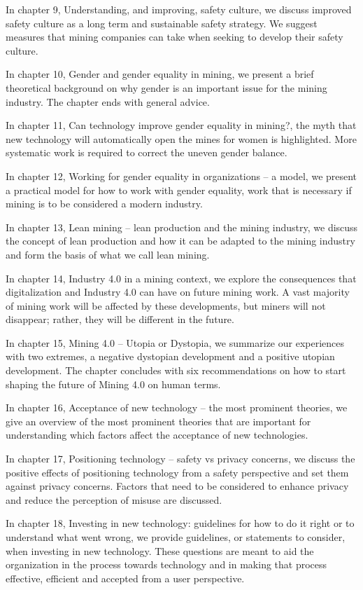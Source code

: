 \documentclass[
  12pt,
]{scrbook}
\begin{document}
In chapter 9, Understanding, and improving, safety culture, we discuss improved safety culture as a long term and sustainable safety strategy. We suggest measures that mining companies can take when seeking to develop their safety culture.

In chapter 10, Gender and gender equality in mining, we present a brief theoretical background on why gender is an important issue for the mining industry. The chapter ends with general advice.

In chapter 11, Can technology improve gender equality in mining?, the myth that new technology will automatically open the mines for women is highlighted. More systematic work is required to correct the uneven gender balance.

In chapter 12, Working for gender equality in organizations -- a model, we present a practical model for how to work with gender equality, work that is necessary if mining is to be considered a modern industry.

In chapter 13, Lean mining -- lean production and the mining industry, we discuss the concept of lean production and how it can be adapted to the mining industry and form the basis of what we call lean mining.

In chapter 14, Industry 4.0 in a mining context, we explore the consequences that digitalization and Industry 4.0 can have on future mining work. A vast majority of mining work will be affected by these developments, but miners will not disappear; rather, they will be different in the future.

In chapter 15, Mining 4.0 -- Utopia or Dystopia, we summarize our experiences with two extremes, a negative dystopian development and a positive utopian development. The chapter concludes with six recommendations on how to start shaping the future of Mining 4.0 on human terms.

In chapter 16, Acceptance of new technology -- the most prominent theories, we give an overview of the most prominent theories that are important for understanding which factors affect the acceptance of new technologies.

In chapter 17, Positioning technology -- safety vs privacy concerns, we discuss the positive effects of positioning technology from a safety perspective and set them against privacy concerns. Factors that need to be considered to enhance privacy and reduce the perception of misuse are discussed.

In chapter 18, Investing in new technology: guidelines for how to do it right or to understand what went wrong, we provide guidelines, or statements to consider, when investing in new technology. These questions are meant to aid the organization in the process towards technology and in making that process effective, efficient and accepted from a user perspective.
\end{document}
